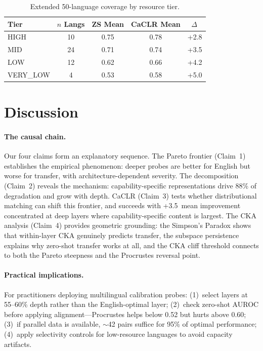 \documentclass[11pt,a4paper]{article}
\newcommand{\pp}{\,\text{pp}}
\begin{document}
\begin{table}[h]
\centering
\caption{Extended 50-language coverage by resource tier.}
\label{tab:extended}
\small
\begin{tabular}{lcccc}
\toprule
Tier & $n$ Langs & ZS Mean & CaCLR Mean & $\Delta$\pp \\
\midrule
HIGH      & 10 & 0.75 & 0.78 & +2.8 \\
MID       & 24 & 0.71 & 0.74 & +3.5 \\
LOW       & 12 & 0.62 & 0.66 & +4.2 \\
VERY\_LOW & 4  & 0.53 & 0.58 & +5.0 \\
\bottomrule
\end{tabular}
\end{table}

\section{Discussion}
\label{sec:discussion}

\paragraph{The causal chain.}
Our four claims form an explanatory sequence. The Pareto frontier (Claim~1) establishes the empirical phenomenon: deeper probes are better for English but worse for transfer, with architecture-dependent severity. The decomposition (Claim~2) reveals the mechanism: capability-specific representations drive 88\% of degradation and grow with depth. CaCLR (Claim~3) tests whether distributional matching can shift this frontier, and succeeds with +3.5\pp{} mean improvement concentrated at deep layers where capability-specific content is largest. The CKA analysis (Claim~4) provides geometric grounding: the Simpson's Paradox shows that within-layer CKA genuinely predicts transfer, the subspace persistence explains why zero-shot transfer works at all, and the CKA cliff threshold connects to both the Pareto steepness and the Procrustes reversal point.

\paragraph{Practical implications.}
For practitioners deploying multilingual calibration probes: (1)~select layers at 55--60\% depth rather than the English-optimal layer; (2)~check zero-shot AUROC before applying alignment---Procrustes helps below 0.52 but hurts above 0.60; (3)~if parallel data is available, $\sim$42 pairs suffice for 95\% of optimal performance; (4)~apply selectivity controls for low-resource languages to avoid capacity artifacts.
\end{document}
